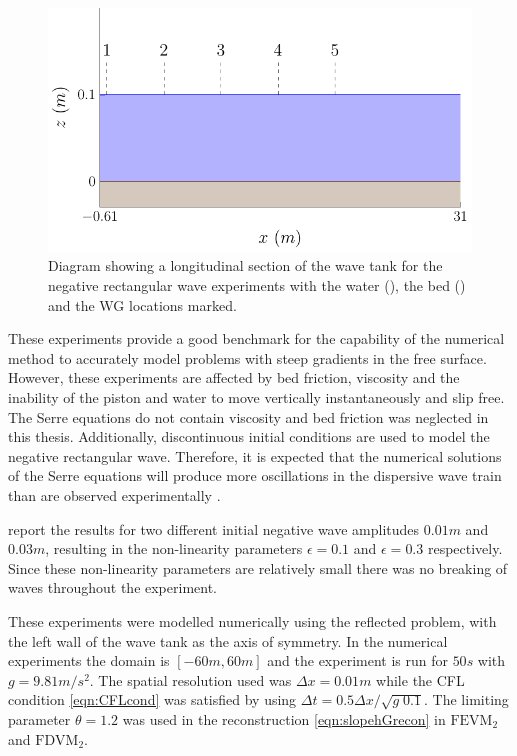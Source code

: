 \begin{figure}
	\centering
	\includegraphics[width=\textwidth]{./chp6/figures/Experiment/Segur/WaveTank.pdf}
	\caption{Diagram showing a longitudinal section of the wave tank for the negative rectangular wave experiments with the water (), the bed () and the WG locations marked.}
	\label{fig:SegurWT}
\end{figure} 

These experiments provide a good benchmark for the capability of the numerical method to accurately model problems with steep gradients in the free surface. However, these experiments are affected by bed friction, viscosity and the inability of the piston and water to move vertically instantaneously and slip free. The Serre equations do not contain viscosity and bed friction was neglected in this thesis. Additionally, discontinuous initial conditions are used to model the negative rectangular wave. Therefore, it is expected that the numerical solutions of the Serre equations will produce more oscillations in the dispersive wave train than are observed experimentally \cite{Pitt-2018-61}.

\citet{Hammack-Segur-1978-337} report the results for two different initial negative wave amplitudes $0.01m$ and $0.03m$, resulting in the non-linearity parameters $\epsilon = 0.1$ and $\epsilon=0.3$ respectively. Since these non-linearity parameters are relatively small there was no breaking of waves throughout the experiment.

These experiments were modelled numerically using the reflected problem, with the left wall of the wave tank as the axis of symmetry. In the numerical experiments the domain is $[-60m,60m]$ and the experiment is run for $ 50s$ with $g = 9.81m/s^2$. The spatial resolution used was $\Delta x = 0.01m$ while the CFL condition \eqref{eqn:CFLcond} was satisfied by using $\Delta t = 0.5 \Delta x / \sqrt{g \; 0.1}$. The limiting parameter $\theta = 1.2$ was used in the reconstruction \eqref{eqn:slopehGrecon} in $\text{FEVM}_2$ and $\text{FDVM}_2$.

